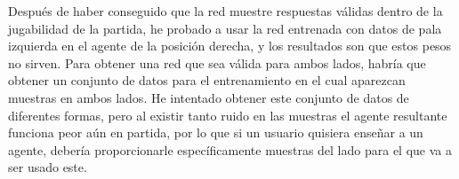 Después de haber conseguido que la red muestre respuestas válidas dentro de la jugabilidad de la partida, he probado a usar la red entrenada con datos de pala izquierda en el agente de la posición derecha, y los resultados son que estos pesos no sirven. Para obtener una red que sea válida para ambos lados, habría que obtener un conjunto de datos para el entrenamiento en el cual aparezcan muestras en ambos lados. He intentado obtener este conjunto de datos de diferentes formas, pero al existir tanto ruido en las muestras el agente resultante funciona peor aún en partida, por lo que si un usuario quisiera enseñar a un agente, debería proporcionarle específicamente muestras del lado para el que va a ser usado este.